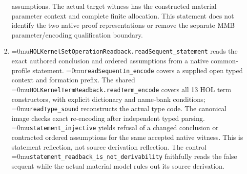 \documentclass[11pt]{article}
\newcommand{\leanname}[1]{\textup{\Urlmuskip=0mu\relax\nolinkurl{#1}}}
\theoremstyle{definition}
\theoremstyle{remark}
\begin{document}
\begin{enumerate}[leftmargin=*]
  assumptions. The actual target witness has the constructed material parameter
  context and complete finite allocation. This statement does not identify the
  two native proof representations or remove the separate MMB parameter/encoding
  qualification boundary.
\item \leanname{HOLKernelSetOperationReadback.readSequent_statement} reads
  the exact authored conclusion and ordered assumptions from a native common-profile
  statement. \leanname{readSequentIn_encode} covers a supplied open typed context
  and formation prefix. The shared \leanname{HOLKernelTermReadback.readTerm_encode}
  covers all 13 HOL term constructors, with explicit dictionary and name-bank
  conditions; \leanname{readType_sound} reconstructs the actual type code.
  The canonical image checks exact re-encoding after independent typed parsing.
  \leanname{statement_injective} yields refusal of a changed conclusion or
  contracted ordered assumptions for the same accepted native witness.
  This is statement reflection, not source derivation reflection. The control
  \leanname{statement_readback_is_not_derivability} faithfully reads the false
  sequent while the actual material model rules out its source derivation.


\end{enumerate}
\end{document}
